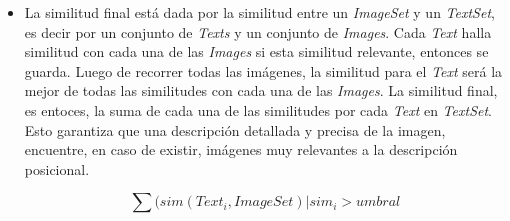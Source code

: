 \begin{itemize}
    \item La similitud final est\'a dada por la similitud entre un \textit{ImageSet} y un \textit{TextSet}, es decir por un conjunto de \textit{Texts} y un conjunto de \textit{Images}. Cada \textit{Text} halla similitud con cada una de las \textit{Images} si esta similitud relevante, entonces se guarda. Luego de recorrer todas las im\'agenes, la similitud para el \textit{Text} ser\'a la mejor de todas las similitudes con cada una de las \textit{Images}. La similitud final, es entoces, la suma de cada una de las similitudes por cada \textit{Text} en \textit{TextSet}. Esto garantiza que una descripci\'on detallada y precisa de la imagen, encuentre, en caso de existir, im\'agenes muy relevantes a la descripci\'on posicional.
        
        \[\sum(sim(Text_i, ImageSet) | sim_i>umbral\]
    

\end{itemize}

